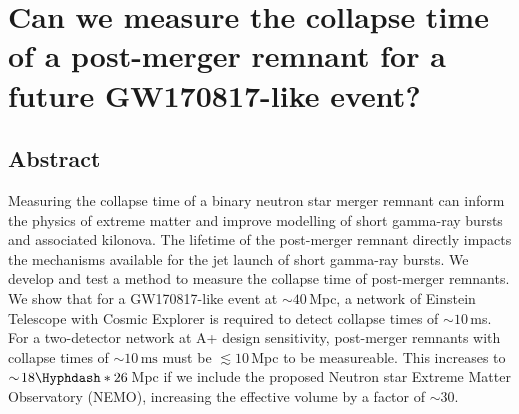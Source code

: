 \documentclass[../Thesis.tex]{subfiles}
\begin{document}
\begingroup
\clearpage%
\let\clearpage\relax%
\vspace*{-2cm}%



\chapter{Can we measure the collapse time of a post-merger remnant for a future GW170817-like event?}
\label{chapter:CollapseTime}
\endgroup






\section*{Abstract}

    
    Measuring the collapse time of a binary neutron star merger remnant can inform the physics of extreme matter and improve modelling of short gamma-ray bursts and associated kilonova.
    The lifetime of the post-merger remnant directly impacts the mechanisms available for the jet launch of short gamma-ray bursts.
    We develop and test a method to measure the collapse time of post-merger remnants.
    We show that for a GW170817-like event at $\sim\!40$\,Mpc, a network of Einstein Telescope with Cosmic Explorer is required to detect collapse times of $\sim\!10$\,ms.
    For a two-detector network at A+ design sensitivity, post-merger remnants with collapse times of $\sim\!10\,\mathrm{ms}$ must be $\lesssim 10$\,Mpc to be measureable.
    This increases to $\sim\!18\Hyphdash*26$\,Mpc if we include the proposed Neutron star Extreme Matter Observatory (NEMO), increasing the effective volume by a factor of $\sim\!30$.


    
    \vspace{-0.25cm}
\end{document}
